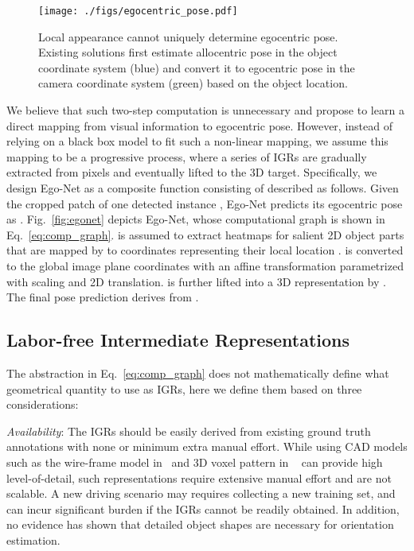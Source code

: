 \documentclass[final]{cvpr}
\begin{document}
\begin{figure}[h]
	\begin{center}
		\texttt{[image: ./figs/egocentric\_pose.pdf]}
	\end{center}
	\caption{Local appearance cannot uniquely determine egocentric pose. Existing solutions first estimate allocentric pose in the object coordinate system (blue) and convert it to egocentric pose in the camera coordinate system (green) based on the object location.}
	\label{fig:3.1}
\end{figure}

We believe that such two-step computation is unnecessary and propose to learn a direct mapping  from visual information to egocentric pose. However, instead of relying on a black box model to fit such a non-linear mapping, we assume this mapping to be a progressive process, where a series of IGRs are gradually extracted from pixels and eventually lifted to the 3D target. Specifically, we design Ego-Net as a composite function consisting of  described as follows. Given the cropped patch of one detected instance , Ego-Net predicts its egocentric pose as . Fig.~\ref{fig:egonet} depicts Ego-Net, whose computational graph is shown in Eq.~\ref{eq:comp_graph}.  is assumed to extract heatmaps  for salient 2D object parts that are mapped by  to coordinates representing their local location .  is converted to the global image plane coordinates  with an affine transformation  parametrized with scaling and 2D translation.  is further lifted into a 3D representation  by . The final pose prediction derives from .        
 


\subsection{Labor-free Intermediate Representations}
The abstraction in Eq.~\ref{eq:comp_graph} does not mathematically define what geometrical quantity to use as IGRs, here we define them based on three considerations:

\noindent \emph{Availability}: The IGRs should be easily derived from existing ground truth annotations with none or minimum extra manual effort. While using CAD models such as the wire-frame model in~\cite{chabot2017deep} and 3D voxel pattern in ~\cite{xiang2015data} can provide high level-of-detail, such representations require extensive manual effort and are not scalable. A new driving scenario may requires collecting a new training set, and can incur significant burden if the IGRs cannot be readily obtained. In addition, no evidence has shown that detailed object shapes are necessary for orientation estimation.
\end{document}
